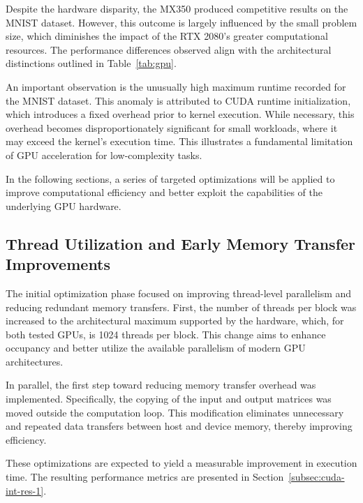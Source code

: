 \documentclass[modern,longauthor]{aastex7}
\begin{document}
Despite the hardware disparity, the MX350 produced competitive results on the MNIST dataset. However, this outcome is largely influenced by the small problem size, which diminishes the impact of the RTX 2080’s greater computational resources. The performance differences observed align with the architectural distinctions outlined in Table~\ref{tab:gpu}.

An important observation is the unusually high maximum runtime recorded for the MNIST dataset. This anomaly is attributed to CUDA runtime initialization, which introduces a fixed overhead prior to kernel execution. While necessary, this overhead becomes disproportionately significant for small workloads, where it may exceed the kernel's execution time. This illustrates a fundamental limitation of GPU acceleration for low-complexity tasks.

In the following sections, a series of targeted optimizations will be applied to improve computational efficiency and better exploit the capabilities of the underlying GPU hardware.
\subsection{Thread Utilization and Early Memory Transfer Improvements}\label{subsec:cuda-first-improvements}
The initial optimization phase focused on improving thread-level parallelism and reducing redundant memory transfers. First, the number of threads per block was increased to the architectural maximum supported by the hardware, which, for both tested GPUs, is 1024 threads per block. This change aims to enhance occupancy and better utilize the available parallelism of modern GPU architectures.

In parallel, the first step toward reducing memory transfer overhead was implemented. Specifically, the copying of the input and output matrices was moved outside the computation loop. This modification eliminates unnecessary and repeated data transfers between host and device memory, thereby improving efficiency.

These optimizations are expected to yield a measurable improvement in execution time. The resulting performance metrics are presented in Section~\ref{subsec:cuda-int-res-1}.
\end{document}

